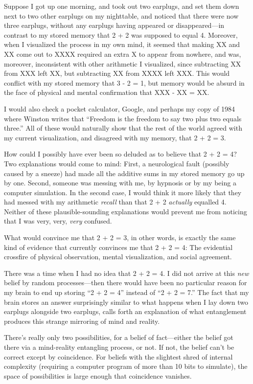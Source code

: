 {
 Suppose I got up one morning, and took out two earplugs, and set
them down next to two other earplugs on my nighttable, and noticed that
there were now three earplugs, without any earplugs having appeared or
disappeared---in contrast to my stored memory that 2 + 2 was supposed
to equal 4. Moreover, when I visualized the process in my own mind, it
seemed that making XX and XX come out to XXXX required an extra X to
appear from nowhere, and was, moreover, inconsistent with other
arithmetic I visualized, since subtracting XX from XXX left XX, but
subtracting XX from XXXX left XXX. This would conflict with my stored
memory that 3 - 2 = 1, but memory would be absurd in the face of
physical and mental confirmation that XXX - XX = XX.}

{
 I would also check a pocket calculator, Google, and perhaps my
copy of 1984 where Winston writes that ``Freedom is
the freedom to say two plus two equals three.'' All
of these would naturally show that the rest of the world agreed with my
current visualization, and disagreed with my memory, that 2 + 2 = 3.}

{
 How could I possibly have ever been so deluded as to believe that
2 + 2 = 4? Two explanations would come to mind: First, a neurological
fault (possibly caused by a sneeze) had made all the additive sums in
my stored memory go up by one. Second, someone was messing with me, by
hypnosis or by my being a computer simulation. In the second case, I
would think it more likely that they had messed with my arithmetic
\textit{recall} than that 2 + 2 \textit{actually} equalled 4. Neither
of these plausible-sounding explanations would prevent me from noticing
that I was very, very, \textit{very} confused.}

{
 What would convince me that 2 + 2 = 3, in other words, is exactly
the same kind of evidence that currently convinces me that 2 + 2 = 4:
The evidential crossfire of physical observation, mental visualization,
and social agreement.}

{
 There was a time when I had no idea that 2 + 2 = 4. I did not
arrive at this \textit{new} belief by random processes---then there
would have been no particular reason for my brain to end up storing
``2 + 2 = 4'' instead of
``2 + 2 = 7.'' The fact that my
brain stores an answer surprisingly similar to what happens when I lay
down two earplugs alongside two earplugs, calls forth an explanation of
what entanglement produces this strange mirroring of mind and reality.}

{
 There's really only two possibilities, for a
belief of fact---either the belief got there via a mind-reality
entangling process, or not. If not, the belief can't be
correct except by coincidence. For beliefs with the slightest shred of
internal complexity (requiring a computer program of more than 10 bits
to simulate), the space of possibilities is large enough that
coincidence vanishes.}

